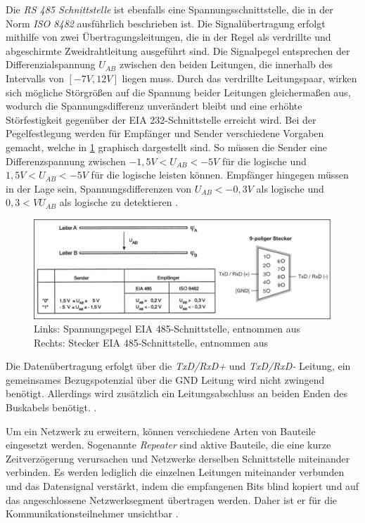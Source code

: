 Die \textit{RS 485 Schnittstelle} ist ebenfalls eine Spannungsschnittstelle, die in der Norm \textit{ISO 8482} ausführlich beschrieben ist. Die Signalübertragung erfolgt mithilfe von zwei Übertragungsleitungen, die in der Regel als verdrillte und abgeschirmte Zweidrahtleitung ausgeführt sind. Die Signalpegel entsprechen der Differenzialspannung $U_{AB}$ zwischen den beiden Leitungen, die innerhalb des Intervalls von $[-7V,12V]$ liegen muss. Durch das verdrillte Leitungspaar, wirken sich mögliche Störgrößen auf die Spannung beider Leitungen gleichermaßen aus, wodurch die Spannungsdifferenz unverändert bleibt und eine erhöhte Störfestigkeit gegenüber der EIA 232-Schnittstelle erreicht wird.
Bei der Pegelfestlegung werden für Empfänger und Sender verschiedene Vorgaben gemacht, welche in \ref{fig:rs485} graphisch dargestellt sind. So müssen die Sender eine Differenzspannung zwischen $-1,5V<U_{AB}<-5V$ für die logische \Gob und $1,5V<U_{AB}<-5V$ für die logische \Gob leisten können. Empfänger hingegen müssen in der Lage sein, Spannungsdifferenzen von $U_{AB}<-0,3V$ als logische \Gob und $0,3<VU_{AB}$ als logische \Gob zu detektieren \cite[S.~59ff.]{schn06}.

\begin{figure}
\centering
\includegraphics[width=\textwidth]{abbildungen/20160314_rs485}
\caption[Spannungspegel und Stecker der EIA 485-Schnittstelle]{Links: Spannungspegel EIA 485-Schnittstelle, entnommen aus \cite[S.~60]{schn06} \newline Rechts: Stecker EIA 485-Schnittstelle, entnommen aus \cite[S.~19]{sch08}}
\label{fig:rs485}
\end{figure}

Die Datenübertragung erfolgt über die \textit{TxD/RxD+} und \textit{TxD/RxD-} Leitung, ein gemeinsames Bezugspotenzial über die GND Leitung wird nicht zwingend benötigt. Allerdings wird zusätzlich ein Leitungsabschluss an beiden Enden des Buskabels benötigt.  \cite[S.~19f.]{sch08}.

Um ein Netzwerk zu erweitern, können verschiedene Arten von Bauteile eingesetzt werden. Sogenannte \textit{Repeater} sind aktive Bauteile, die eine kurze Zeitverzögerung verursachen und Netzwerke derselben Schnittstelle miteinander verbinden. Es werden lediglich die einzelnen Leitungen miteinander verbunden und das Datensignal verstärkt, indem die empfangenen Bits blind kopiert und auf das angeschlossene Netzwerksegment übertragen werden. Daher ist er für die Kommunikationsteilnehmer unsichtbar \cite[S.~79f.]{schn06}.

